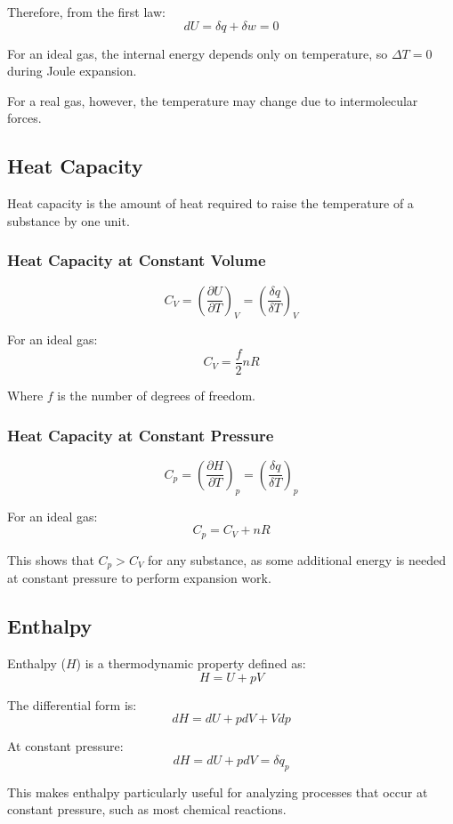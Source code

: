 \documentclass{article}
\theoremstyle{definition}
\begin{document}
Therefore, from the first law:
\[
dU = \delta q + \delta w = 0
\]

For an ideal gas, the internal energy depends only on temperature, so $\Delta T = 0$ during Joule expansion. 

For a real gas, however, the temperature may change due to intermolecular forces.

\subsection{Heat Capacity}

Heat capacity is the amount of heat required to raise the temperature of a substance by one unit.

\subsubsection{Heat Capacity at Constant Volume}

\[
C_V = \left(\frac{\partial U}{\partial T}\right)_V = \left(\frac{\delta q}{\delta T}\right)_V
\]

For an ideal gas:
\[
C_V = \frac{f}{2}nR
\]

Where $f$ is the number of degrees of freedom.

\subsubsection{Heat Capacity at Constant Pressure}

\[
C_p = \left(\frac{\partial H}{\partial T}\right)_p = \left(\frac{\delta q}{\delta T}\right)_p
\]

For an ideal gas:
\[
C_p = C_V + nR
\]

This shows that $C_p > C_V$ for any substance, as some additional energy is needed at constant pressure to perform expansion work.

\subsection{Enthalpy}

Enthalpy ($H$) is a thermodynamic property defined as:
\[
H = U + pV
\]

The differential form is:
\[
dH = dU + pdV + Vdp
\]

At constant pressure:
\[
dH = dU + pdV = \delta q_p
\]

This makes enthalpy particularly useful for analyzing processes that occur at constant pressure, such as most chemical reactions.
\end{document}
